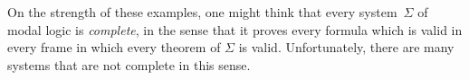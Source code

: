 \documentclass[../../../include/open-logic-section]{subfiles}
\begin{document}
On the strength of these examples, one might think that every
system~$\Sigma$ of modal logic is \emph{complete}, in the sense that
it proves every formula which is valid in every frame in which every
theorem of $\Sigma$ is valid. Unfortunately, there are many systems
that are not complete in this sense.
\end{document}
